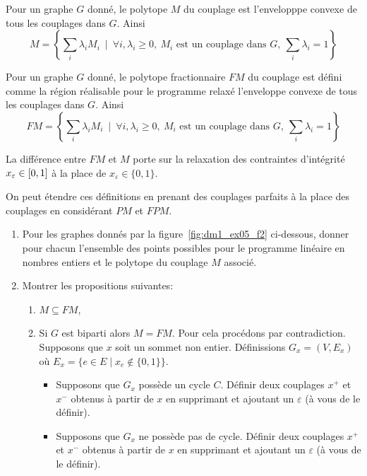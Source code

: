 \begin{td-exo}
\begin{enumerate}
		\begin{definition}
			Pour un graphe \(G\) donné, le polytope \(M\) du couplage est l'envelopppe convexe de tous les couplages dans \(G\).
			Ainsi
			\begin{equation*}
				M = \left\{ \sum_i \lambda_i M_i \ \mid\ \forall i, \lambda_i \geq 0,\ M_i \text{ est un couplage dans } G,\ \sum_i \lambda_i = 1 \right\}
			\end{equation*}
		\end{definition}
		\begin{definition}
			Pour un graphe \(G\) donné, le polytope fractionnaire \(FM\) du couplage est défini comme la région réalisable pour le programme relaxé l'enveloppe convexe de tous les couplages dans \(G\).
			Ainsi
			\begin{equation*}
				FM = \left\{ \sum_i \lambda_i M_i \ \mid\ \forall i, \lambda_i \geq 0,\ M_i \text{ est un couplage dans } G,\ \sum_i \lambda_i = 1 \right\}
			\end{equation*}
		\end{definition}
		La différence entre \(FM\) et \(M\) porte sur la relaxation des contraintes d'intégrité \(x_\varepsilon \in \mathopen{}\left[0, 1\right]\mathclose{}\) à la place de \(x_\varepsilon \in \{0, 1\}\).

		On peut étendre ces définitions en prenant des couplages parfaits à la place des couplages en considérant \(PM\) et \(FPM\).

		\begin{enumerate}
			\item Pour les graphes donnés par la figure~\ref{fig:dm1_ex05_f2} ci-dessous, donner pour chacun l'ensemble des points possibles pour le programme linéaire en nombres entiers et le polytope du couplage \(M\) associé.

			

			\item Montrer les propositions suivantes:

			\begin{enumerate}
				\item \(M \subseteq FM\),

				\item Si \(G\) est biparti alors \(M = FM\).
				Pour cela procédons par contradiction.
				Supposons que \(x\) soit un sommet non entier.
				Définissions \(G_x = (V, E_x)\) où \(E_x = \{e \in E \mid x_e \notin \{0, 1\}\}\).

				\begin{itemize}
					\item Supposons que \(G_x\) possède un cycle \(C\).
					Définir deux couplages \(x^+\) et \(x^-\) obtenus à partir de \(x\) en supprimant et ajoutant un \(\varepsilon\) (à vous de le définir).
					\item Supposons que \(G_x\) ne possède pas de cycle.
					Définir deux couplages \(x^+\) et \(x^-\) obtenus à partir de \(x\) en supprimant et ajoutant un \(\varepsilon\) (à vous de le définir).
				\end{itemize}


\end{enumerate}
\end{enumerate}
\end{enumerate}
\end{td-exo}
